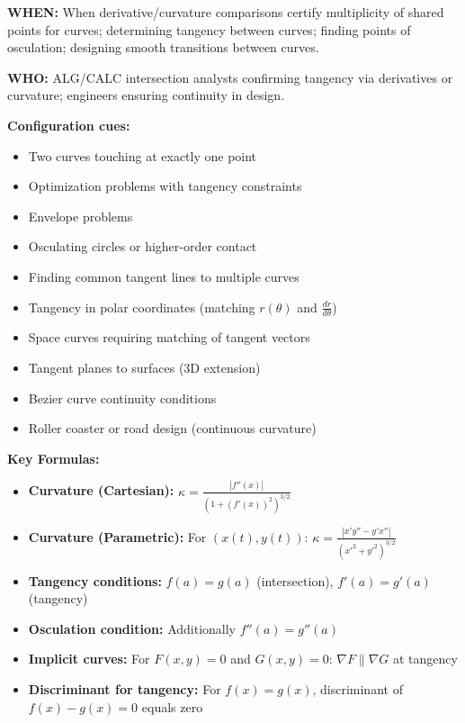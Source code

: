 \documentclass[12pt]{article}
\begin{document}
\textbf{WHEN:} When derivative/curvature comparisons certify multiplicity of shared points for curves; determining tangency between curves; finding points of osculation; designing smooth transitions between curves.

\textbf{WHO:} ALG/CALC intersection analysts confirming tangency via derivatives or curvature; engineers ensuring continuity in design.

\textbf{Configuration cues:}
\begin{itemize}
    \item Two curves touching at exactly one point
    \item Optimization problems with tangency constraints
    \item Envelope problems
    \item Osculating circles or higher-order contact
    \item Finding common tangent lines to multiple curves
    \item Tangency in polar coordinates (matching $r(\theta)$ and $\frac{dr}{d\theta}$)
    \item Space curves requiring matching of tangent vectors
    \item Tangent planes to surfaces (3D extension)
    \item Bezier curve continuity conditions
    \item Roller coaster or road design (continuous curvature)
\end{itemize}

\textbf{Key Formulas:}
\begin{itemize}
    \item \textbf{Curvature (Cartesian):} $\kappa = \frac{|f''(x)|}{(1 + (f'(x))^2)^{3/2}}$
    \item \textbf{Curvature (Parametric):} For $(x(t), y(t))$: $\kappa = \frac{|x'y'' - y'x''|}{(x'^2 + y'^2)^{3/2}}$
    \item \textbf{Tangency conditions:} $f(a) = g(a)$ (intersection), $f'(a) = g'(a)$ (tangency)
    \item \textbf{Osculation condition:} Additionally $f''(a) = g''(a)$
    \item \textbf{Implicit curves:} For $F(x,y) = 0$ and $G(x,y) = 0$: $\nabla F \parallel \nabla G$ at tangency
    \item \textbf{Discriminant for tangency:} For $f(x) = g(x)$, discriminant of $f(x) - g(x) = 0$ equals zero
\end{itemize}
\end{document}
